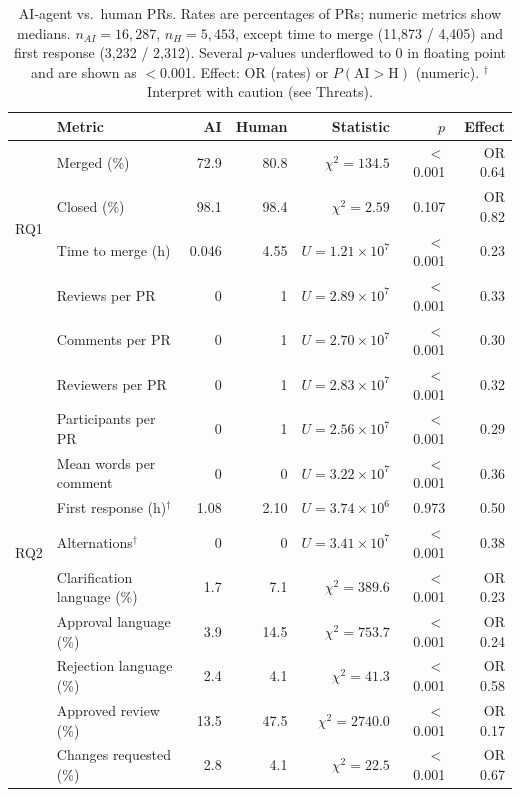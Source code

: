 \documentclass[conference]{IEEEtran}
\begin{document}
\begin{table}[t]
\caption{AI-agent vs.\ human PRs. Rates are percentages of PRs; numeric metrics show medians. $n_{AI}{=}16{,}287$, $n_H{=}5{,}453$, except time to merge (11{,}873 / 4{,}405) and first response (3{,}232 / 2{,}312). Several $p$-values underflowed to 0 in floating point and are shown as $<$0.001. Effect: OR (rates) or $P(\mathrm{AI}{>}\mathrm{H})$ (numeric). $^\dagger$ Interpret with caution (see Threats).}
\label{tab:results}
\centering\small
\begin{tabular}{@{}llrrrrr@{}}
\toprule
 & Metric & AI & Human & Statistic & $p$ & Effect \\
\midrule
\multirow{4}{*}{RQ1} & Merged (\%) & 72.9 & 80.8 & $\chi^2=134.5$ & $<$0.001 & OR 0.64 \\
 & Closed (\%) & 98.1 & 98.4 & $\chi^2=2.59$ & 0.107 & OR 0.82 \\
 & Time to merge (h) & 0.046 & 4.55 & $U=1.21{\times}10^{7}$ & $<$0.001 & 0.23 \\
 & Reviews per PR & 0 & 1 & $U=2.89{\times}10^{7}$ & $<$0.001 & 0.33 \\
\midrule
\multirow{11}{*}{RQ2} & Comments per PR & 0 & 1 & $U=2.70{\times}10^{7}$ & $<$0.001 & 0.30 \\
 & Reviewers per PR & 0 & 1 & $U=2.83{\times}10^{7}$ & $<$0.001 & 0.32 \\
 & Participants per PR & 0 & 1 & $U=2.56{\times}10^{7}$ & $<$0.001 & 0.29 \\
 & Mean words per comment & 0 & 0 & $U=3.22{\times}10^{7}$ & $<$0.001 & 0.36 \\
 & First response (h)$^\dagger$ & 1.08 & 2.10 & $U=3.74{\times}10^{6}$ & 0.973 & 0.50 \\
 & Alternations$^\dagger$ & 0 & 0 & $U=3.41{\times}10^{7}$ & $<$0.001 & 0.38 \\
 & Clarification language (\%) & 1.7 & 7.1 & $\chi^2=389.6$ & $<$0.001 & OR 0.23 \\
 & Approval language (\%) & 3.9 & 14.5 & $\chi^2=753.7$ & $<$0.001 & OR 0.24 \\
 & Rejection language (\%) & 2.4 & 4.1 & $\chi^2=41.3$ & $<$0.001 & OR 0.58 \\
 & Approved review (\%) & 13.5 & 47.5 & $\chi^2=2740.0$ & $<$0.001 & OR 0.17 \\
 & Changes requested (\%) & 2.8 & 4.1 & $\chi^2=22.5$ & $<$0.001 & OR 0.67 \\
\bottomrule
\end{tabular}
\end{table}
\end{document}
